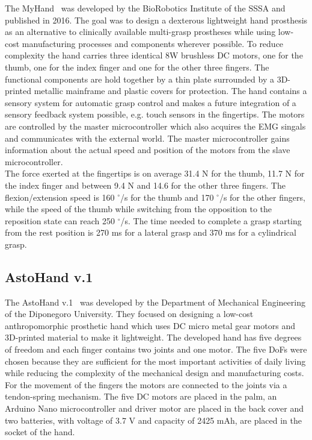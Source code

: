\documentclass[a4paper, 10pt, conference]{ieeeconf}      %
\begin{document}
The MyHand~\cite{myhand} was developed by the BioRobotics Institute of the SSSA and published in 2016. The goal was to design a dexterous lightweight hand prosthesis as an alternative to clinically available multi-grasp prostheses while using low-cost manufacturing processes and components wherever possible. To reduce complexity the hand carries three identical 8W brushless DC motors, one for the thumb, one for the index finger and one for the other three fingers. The functional components are hold together by a thin plate surrounded by a 3D-printed metallic mainframe and plastic covers for protection. The hand contains a sensory system for automatic grasp control and makes a future integration of a sensory feedback system possible, e.g. touch sensors in the fingertips. The motors are controlled by the master microcontroller which also acquires the EMG singals and communicates with the external world. The master microcontroller gains information about the actual speed and position of the motors from the slave microcontroller.\\
The force exerted at the fingertips is on average 31.4 N for the thumb, 11.7 N for the index finger and between 9.4 N and 14.6 for the other three fingers. The flexion/extension speed is 160 $^\circ$/s for the thumb and 170 $^\circ$/s for the other fingers, while the speed of the thumb while switching from the opposition to the reposition state can reach 250 $^\circ$/s. The time needed to complete a grasp starting from the rest position is 270 ms for a lateral grasp and 370 ms for a cylindrical grasp.


\subsection{AstoHand v.1}

The AstoHand v.1~\cite{astohand} was developed by the Department of Mechanical Engineering of the Diponegoro University. They focused on designing a low-cost anthropomorphic prosthetic hand which uses DC micro metal gear motors and 3D-printed material to make it lightweight. The developed hand has five degrees of freedom and each finger contains two joints and one motor. The five DoFs were chosen because they are sufficient for the most important activities of daily living while reducing the complexity of the mechanical design and manufacturing costs. For the movement of the fingers the motors are connected to the joints via a tendon-spring mechanism. The five DC motors are placed in the palm, an Arduino Nano microcontroller and driver motor are placed in the back cover and two batteries, with voltage of 3.7 V and capacity of 2425 mAh, are placed in the socket of the hand.
\end{document}
